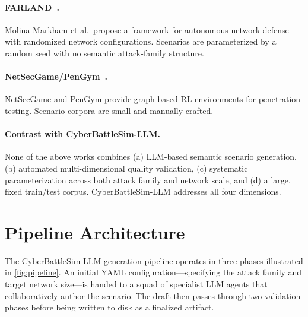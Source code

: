 \documentclass[11pt,a4paper]{article}
\newcommand{\CBSL}{CyberBattleSim-LLM\xspace}
\newcommand{\FARLAND}{FARLAND\xspace}
\newcommand{\NSG}{NetSecGame\xspace}
\begin{document}
\paragraph{\FARLAND~\cite{farland2021}.}
Molina-Markham et al.\ propose a framework for autonomous network defense
with randomized network configurations.  Scenarios are parameterized by a
random seed with no semantic attack-family structure.

\paragraph{\NSG/PenGym~\cite{netsecgame2024}.}
NetSecGame and PenGym provide graph-based RL environments for penetration
testing.  Scenario corpora are small and manually crafted.

\paragraph{Contrast with \CBSL.}
None of the above works combines (a) LLM-based semantic scenario generation,
(b) automated multi-dimensional quality validation, (c) systematic
parameterization across both attack family and network scale, and (d) a
large, fixed train/test corpus.  \CBSL addresses all four dimensions.

\section{Pipeline Architecture}
\label{sec:pipeline}

The \CBSL generation pipeline operates in three phases illustrated in
\cref{fig:pipeline}.  An initial YAML configuration—specifying the attack
family and target network size—is handed to a squad of specialist LLM agents
that collaboratively author the scenario.  The draft then passes through two
validation phases before being written to disk as a finalized artifact.
\end{document}
